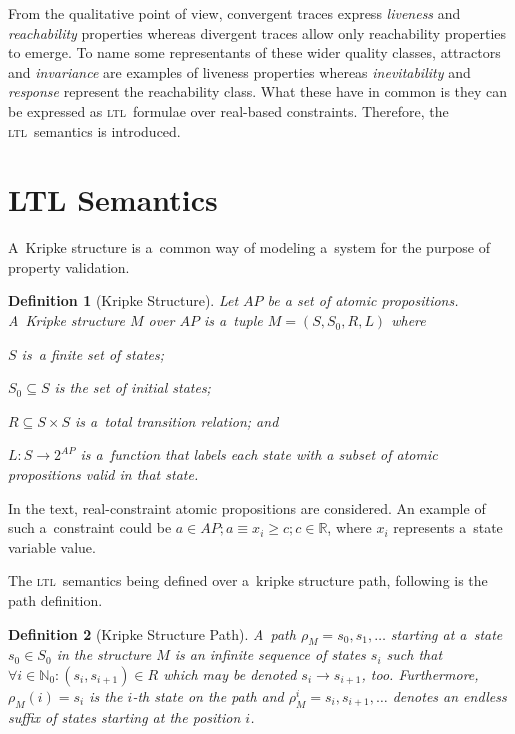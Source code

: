 \documentclass[12pt,oneside,draft]{fithesis}
\newcommand{\ltl}{\textsc{ltl}~}
\newcommand{\mReal}{\mathbb{R}}
\newcommand{\mNatural}{\mathbb{N}}
\newtheorem{mydef}{Definition}
\begin{document}
From the qualitative point of view, convergent traces express
\emph{liveness} and \emph{reachability} properties whereas
divergent traces allow only reachability properties to emerge.
To name some representants of these wider quality classes,
attractors and  \emph{invariance} are examples of liveness
properties whereas \emph{inevitability} and \emph{response} represent
the reachability class\cite{rizk}. What these have in common is they
can be expressed as \ltl formulae over real-based
constraints\cite{sven}. Therefore, the \ltl semantics is introduced.

\section{LTL Semantics}
A~Kripke structure is a~common way of modeling a~system for the purpose
of property validation\cite{clarke}.
\begin{mydef}[Kripke Structure]
Let ${AP}$ be a set of atomic propositions.
A~Kripke structure\cite{clarke} $M$ over $AP$ is a~tuple
$M=(S, S_0, R, L)$ where
\begin{inparaenum}
	\item{}$S$ is~a finite set of states;
	\item{}$S_0\subseteq{}S$ is the set of initial states;
	\item{}$R\subseteq{}S\times{}S$ is a~total transition relation; and
	\item{}$L:S\rightarrow{}2^{AP}$ is a~function that labels each state
		with a subset of atomic propositions valid in that state.
\end{inparaenum}
\end{mydef}
In the text, real-constraint atomic propositions are considered.
An example of such a~constraint could be
$a\in AP;a\equiv x_i \geq c;c\in\mReal$, where $x_i$ represents a~state
variable value.

The \ltl semantics being defined over a~kripke structure path, following
is the path definition\cite{clarke}.
\begin{mydef}[Kripke Structure Path]
A~path\cite{biere} $\rho_M=s_0,s_1,\dotsc$ starting at a~state
$s_0\in S_0$ in the structure $M$ is an infinite sequence of states
$s_i$ such that $\forall i \in \mNatural_0: (s_i, s_{i+1}) \in R$
which may be denoted $s_i\rightarrow s_{i+1}$, too. 
Furthermore, $\rho_M(i)=s_i$ is the $i$-th state on the path and
$\rho_M^i=s_i,s_{i+1},\dotsc$ denotes an endless suffix of states
starting at the position $i$.
\end{mydef}
\end{document}
